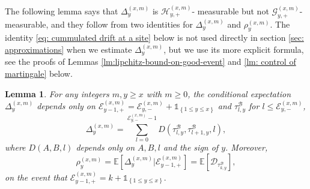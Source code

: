 \documentclass[twoside,12pt, a4paper]{article}
\newtheorem{lemma}{Lemma}[section]
\numberwithin{equation}{section}
\theoremstyle{remark}
\newcommand{\edt}[1]{\textcolor{red}{#1}} %
\begin{document}
	The following lemma says that $\Delta^{(x,m)}_{y}$ is $\mathcal{H}_{y, +}^{(x,m)}$- measurable but not $\mathcal{G}_{y, +}^{(x,m)}$- measurable, and they follow from two identities for $\Delta^{(x,m)}_{y}$ and $\rho_{y}^{(x,m)}$. The identity \eqref{eq: cummulated drift at a site} below is not used directly in section \ref{sec: approximations} when we estimate $\Delta^{(x,m)}_{y}$, but we use its more explicit formula, see the proofs of Lemmas \ref{lm:lipchitz-bound-on-good-event} and \ref{lm: control of martingale} below.
	\begin{lemma}\label{lm: identities for Del, rho} 
		For any integers $m,y\geq x$ with $m\geq 0$, the conditional expectation $\Delta^{(x,m)}_{y}$ depends only on $ \mathcal{E}_{y-1,+}^{(x,m)} = \mathcal{E}_{y,-}^{(x,m)} + \mathbb{1}_{ \left\{ 1\leq y \leq x \right\} }$ and $ \tau^{\mathcal{B}}_{l,y}$ for $l\leq \mathcal{E}^{(x,m)}_{y,-} $,
		\begin{equation} \label{eq: cummulated drift at a site}
			\Delta_{y}^{(x,m)} = \sum_{l=0 }^{ \mathcal{E}^{(x,m)}_{y,-} -1  } D\left(\tau^{\mathcal{B}}_{l,y},\tau^{\mathcal{B}}_{l+1,y},l \right),
		\end{equation}	
		where $D(A,B,l)$ depends only on $A,B,l$ and the sign of $y$.
		Moreover, 
		\begin{equation} \label{eq: conditional mean in GPU represenetation}
			\rho_{y}^{(x,m)} = \mathbb{E}\left[ \Delta_{y}^{(x,m)}\vert \mathcal{E}^{(x,m)}_{y-1,+} \right]	  
			= \mathbb{E}\left[  \mathcal{D}_{\tau^{\mathcal{B}}_{k,y}} \right],
		\end{equation} 
		on the event that $\mathcal{E}^{(x,m)}_{y-1,+}  = k + \mathbb{1}_{\left\{1\leq y\leq x\right\}}.$
	\end{lemma}
\end{document}
